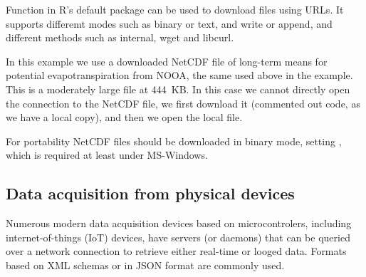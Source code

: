 \documentclass[krantz2]{krantz}\usepackage{knitr}%
\begin{document}
Function  in R's default  package can be used to download files using URLs. It supports differemt modes such as binary or text, and write or append, and different methods such as internal, wget and libcurl.

In this example we use a downloaded NetCDF file of long-term means for potential evapotranspiration from NOOA, the same used above in the  example. This is a moderately large file at 444~KB. In this case we cannot directly open the connection to the NetCDF file, we first download it (commented out code, as we have a local copy), and then we open the local file.

\begin{knitrout}\footnotesize
{}\color{fgcolor}\begin{kframe}
\begin{alltt}
 \hlkwb{<-} \hlstd{(}\hlstd{,}
                \hlstd{,}
                 \hlstd{=} \hlstd{)}
 \hlkwb{<-} \hlstd{(}\hlstd{)}
\end{alltt}
\end{kframe}
\end{knitrout}

\begin{warningbox}
For portability NetCDF files should be downloaded in binary mode, setting , which is required at least under MS-Windows.
\end{warningbox}

\subsection{Data acquisition from physical devices}\label{sec:data:acquisition}

Numerous modern data acquisition devices based on microcontrolers, including internet-of-things (IoT) devices, have servers (or daemons) that can be queried over a network connection to retrieve either real-time or looged data. Formats based on XML schemas or in JSON format are commonly used.

\subsubsection[jsonlite]{}
\end{document}
